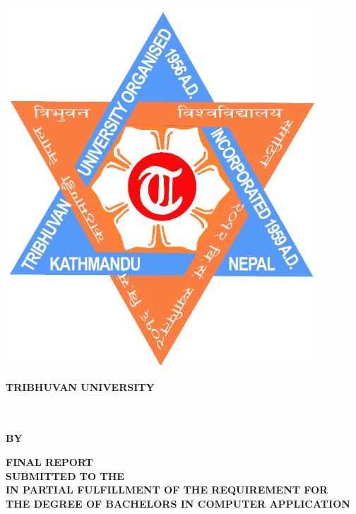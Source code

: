 \thispagestyle{empty}
\begin{center}
\begin{spacing}{1.6}

\includegraphics[scale=0.25]{img/Graphics/TUlogo.png}

\textbf{
\large{TRIBHUVAN UNIVERSITY}\\
\MakeUppercase{\large{\theinstitute}}\\
\MakeUppercase{\large{\thecampus}}}

\vspace{0.5cm}

\hspace{-8cm}

\vspace{0.5cm}

\textbf{\MakeUppercase{\thetitle}\\
\vspace{0.5cm} 
BY \\ 
\MakeUppercase{\theauthor}}

\vspace{0.5cm}

\textbf{FINAL REPORT\\
SUBMITTED TO THE \MakeUppercase{\thedepartment}\\ IN PARTIAL FULFILLMENT OF THE REQUIREMENT FOR\\ THE DEGREE OF BACHELORS IN COMPUTER APPLICATION}
\bigskip

\par
\textbf{\MakeUppercase{\thedepartment}}\\
\textbf{\MakeUppercase{\thedepartmentAddress}}
\vspace{1cm}

\textbf{\MakeUppercase{\thedate}}


\end{spacing}
\end{center}

\clearpage